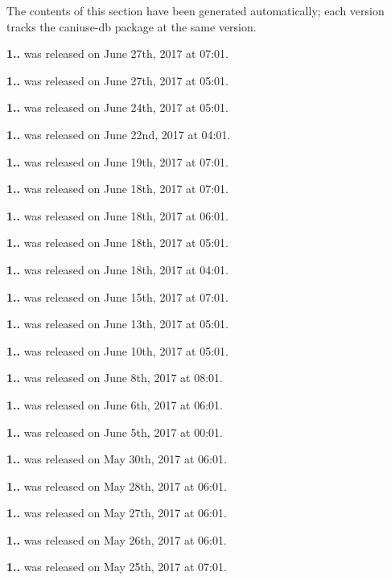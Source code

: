 The contents of this section have been generated automatically; each version tracks the {\ttfamily caniuse-\/db} package at the same version.


\begin{DoxyItemize}
\item {\bfseries 1..} was released on June 27th, 2017 at 07\+:01.
\item {\bfseries 1..} was released on June 27th, 2017 at 05\+:01.
\item {\bfseries 1..} was released on June 24th, 2017 at 05\+:01.
\item {\bfseries 1..} was released on June 22nd, 2017 at 04\+:01.
\item {\bfseries 1..} was released on June 19th, 2017 at 07\+:01.
\item {\bfseries 1..} was released on June 18th, 2017 at 07\+:01.
\item {\bfseries 1..} was released on June 18th, 2017 at 06\+:01.
\item {\bfseries 1..} was released on June 18th, 2017 at 05\+:01.
\item {\bfseries 1..} was released on June 18th, 2017 at 04\+:01.
\item {\bfseries 1..} was released on June 15th, 2017 at 07\+:01.
\item {\bfseries 1..} was released on June 13th, 2017 at 05\+:01.
\item {\bfseries 1..} was released on June 10th, 2017 at 05\+:01.
\item {\bfseries 1..} was released on June 8th, 2017 at 08\+:01.
\item {\bfseries 1..} was released on June 6th, 2017 at 06\+:01.
\item {\bfseries 1..} was released on June 5th, 2017 at 00\+:01.
\item {\bfseries 1..} was released on May 30th, 2017 at 06\+:01.
\item {\bfseries 1..} was released on May 28th, 2017 at 06\+:01.
\item {\bfseries 1..} was released on May 27th, 2017 at 06\+:01.
\item {\bfseries 1..} was released on May 26th, 2017 at 06\+:01.
\item {\bfseries 1..} was released on May 25th, 2017 at 07\+:01.

\end{DoxyItemize}
